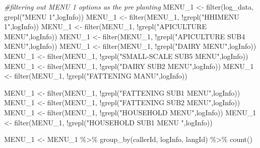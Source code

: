 \documentclass[
]{article}
\newenvironment{Shaded}{\begin{snugshade}}{\end{snugshade}}
\newcommand{\CommentTok}[1]{\textcolor[rgb]{0.56,0.35,0.01}{\textit{#1}}}
\newcommand{\FunctionTok}[1]{\textcolor[rgb]{0.00,0.00,0.00}{#1}}
\newcommand{\NormalTok}[1]{#1}
\newcommand{\OtherTok}[1]{\textcolor[rgb]{0.56,0.35,0.01}{#1}}
\newcommand{\SpecialCharTok}[1]{\textcolor[rgb]{0.00,0.00,0.00}{#1}}
\newcommand{\StringTok}[1]{\textcolor[rgb]{0.31,0.60,0.02}{#1}}
\begin{document}
\begin{Shaded}
\begin{Highlighting}[]
\CommentTok{\#filtering out MENU 1 options as the pre planting}
\NormalTok{MENU\_1 }\OtherTok{\textless{}{-}} \FunctionTok{filter}\NormalTok{(log\_data, }\FunctionTok{grepl}\NormalTok{(}\StringTok{"MENU 1"}\NormalTok{,logInfo))}
\NormalTok{MENU\_1 }\OtherTok{\textless{}{-}} \FunctionTok{filter}\NormalTok{(MENU\_1, }\SpecialCharTok{!}\FunctionTok{grepl}\NormalTok{(}\StringTok{"HHIMENU 1"}\NormalTok{,logInfo))}
\NormalTok{MENU\_1 }\OtherTok{\textless{}{-}} \FunctionTok{filter}\NormalTok{(MENU\_1, }\SpecialCharTok{!}\FunctionTok{grepl}\NormalTok{(}\StringTok{"APICULTURE MENU"}\NormalTok{,logInfo))}
\NormalTok{MENU\_1 }\OtherTok{\textless{}{-}} \FunctionTok{filter}\NormalTok{(MENU\_1, }\SpecialCharTok{!}\FunctionTok{grepl}\NormalTok{(}\StringTok{"APICULTURE SUB4 MENU"}\NormalTok{,logInfo))}
\NormalTok{MENU\_1 }\OtherTok{\textless{}{-}} \FunctionTok{filter}\NormalTok{(MENU\_1, }\SpecialCharTok{!}\FunctionTok{grepl}\NormalTok{(}\StringTok{"DAIRY MENU"}\NormalTok{,logInfo))}
\NormalTok{MENU\_1 }\OtherTok{\textless{}{-}} \FunctionTok{filter}\NormalTok{(MENU\_1, }\SpecialCharTok{!}\FunctionTok{grepl}\NormalTok{(}\StringTok{"SMALL{-}SCALE SUB5 MENU"}\NormalTok{,logInfo))}
\NormalTok{MENU\_1 }\OtherTok{\textless{}{-}} \FunctionTok{filter}\NormalTok{(MENU\_1, }\SpecialCharTok{!}\FunctionTok{grepl}\NormalTok{(}\StringTok{"DAIRY SUB2 MENU"}\NormalTok{,logInfo))}
\NormalTok{MENU\_1 }\OtherTok{\textless{}{-}} \FunctionTok{filter}\NormalTok{(MENU\_1, }\SpecialCharTok{!}\FunctionTok{grepl}\NormalTok{(}\StringTok{"FATTENING MANU"}\NormalTok{,logInfo))}

\NormalTok{MENU\_1 }\OtherTok{\textless{}{-}} \FunctionTok{filter}\NormalTok{(MENU\_1, }\SpecialCharTok{!}\FunctionTok{grepl}\NormalTok{(}\StringTok{"FATTENING SUB1 MENU"}\NormalTok{,logInfo))}
\NormalTok{MENU\_1 }\OtherTok{\textless{}{-}} \FunctionTok{filter}\NormalTok{(MENU\_1, }\SpecialCharTok{!}\FunctionTok{grepl}\NormalTok{(}\StringTok{"FATTENING SUB2 MENU"}\NormalTok{,logInfo))}
\NormalTok{MENU\_1 }\OtherTok{\textless{}{-}} \FunctionTok{filter}\NormalTok{(MENU\_1, }\SpecialCharTok{!}\FunctionTok{grepl}\NormalTok{(}\StringTok{"HOUSEHOLD MENU"}\NormalTok{,logInfo))}
\NormalTok{MENU\_1 }\OtherTok{\textless{}{-}} \FunctionTok{filter}\NormalTok{(MENU\_1, }\SpecialCharTok{!}\FunctionTok{grepl}\NormalTok{(}\StringTok{"HOUSEHOLD SUB1 MENU "}\NormalTok{,logInfo))}


\NormalTok{MENU\_1 }\OtherTok{\textless{}{-}}\NormalTok{ MENU\_1 }\SpecialCharTok{\%\textgreater{}\%}
  \FunctionTok{group\_by}\NormalTok{(callerId, logInfo, langId) }\SpecialCharTok{\%\textgreater{}\%}
  \FunctionTok{count}\NormalTok{()}


\end{Highlighting}
\end{Shaded}
\end{document}
